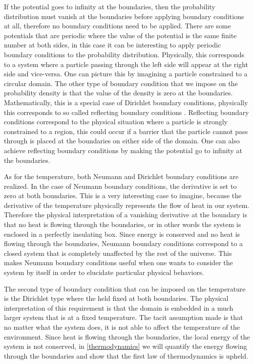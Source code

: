 If the potential goes to infinity at the boundaries, then the probability distribution must vanish at the boundaries before applying boundary conditions at all, therefore no boundary conditions need to be applied. There are some potentials that are periodic where the value of the potential is the same finite number at both sides, in this case it can be interesting to apply periodic boundary conditions to the probability distribution. Physically, this corresponds to a system where a particle passing through the left side will appear at the right side and vice-versa. One can picture this by imagining a particle constrained to a circular domain. The other type of boundary condition that we impose on the probability density is that the value of the density is zero at the boundaries. Mathematically, this is a special case of Dirichlet boundary conditions, physically this corresponds to so called reflecting boundary conditions \cite{Gardiner2009}. Reflecting boundary conditions correspond to the physical situation where a particle is strongly constrained to a region, this could occur if a barrier that the particle cannot pass through is placed at the boundaries on either side of the domain. One can also achieve reflecting boundary conditions by making the potential go to infinity at the boundaries.

As for the temperature, both Neumann and Dirichlet boundary conditions are realized. In the case of Neumann boundary conditions, the derivative is set to zero at both boundaries. This is a very interesting case to imagine, because the derivative of the temperature physically represents the flow of heat in our system. Therefore the physical interpretation of a vanishing derivative at the boundary is that no heat is flowing through the boundaries, or in other words the system is enclosed in a perfectly insulating box. Since energy is conserved and no heat is flowing through the boundaries, Neumann boundary conditions correspond to a closed system that is completely unaffected by the rest of the universe. This makes Neumann boundary conditions useful when one wants to consider the system by itself in order to elucidate particular physical behaviors.

The second type of boundary condition that can be imposed on the temperature is the Dirichlet type where the held fixed at both boundaries. The physical interpretation of this requirement is that the domain is embedded in a much larger system that is at a fixed temperature. The tacit assumption made is that no matter what the system does, it is not able to affect the temperature of the environment. Since heat is flowing through the boundaries, the local energy of the system is not conserved, in \autoref{thermodynamics} we will quantify the energy flowing through the boundaries and show that the first law of thermodynamics is upheld.
